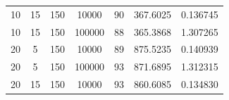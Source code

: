\documentclass[11pt,a4paper]{report}
\begin{document}
\begin{table}[H]
{\begin{tabular}{c|c|c|c|c|c|c}
10                                                                                   & 15                                                                                     & 150                                                                        & 10000                                                                     & 90                                                                                        & 367.6025                                                                  & 0.136745              \\
10                                                                                   & 15                                                                                     & 150                                                                        & 100000                                                                    & 88                                                                                        & 365.3868                                                                  & 1.307265              \\ \hline
20                                                                                   & 5                                                                                      & 150                                                                        & 10000                                                                     & 89                                                                                        & 875.5235                                                                  & 0.140939              \\
20                                                                                   & 5                                                                                      & 150                                                                        & 100000                                                                    & 93                                                                                        & 871.6895                                                                  & 1.312315              \\ \hline
20                                                                                   & 15                                                                                     & 150                                                                        & 10000                                                                     & 93                                                                                        & 860.6085                                                                  & 0.134830              \\

\end{tabular}}
\end{table}
\end{document}
